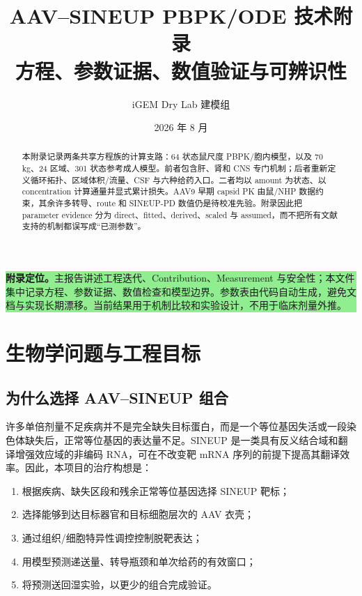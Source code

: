 \documentclass[UTF8,11pt,a4paper]{ctexart}
\title{\vspace{-1.2cm}\textbf{AAV--SINEUP PBPK/ODE 技术附录}\\[0.6em]
\large 方程、参数证据、数值验证与可辨识性}
\author{iGEM Dry Lab 建模组}
\date{2026 年 8 月}
\begin{document}
\maketitle

\begin{center}
\begin{minipage}{0.92\textwidth}
\colorbox{lightgreen}{\parbox{0.96\textwidth}{
\textbf{附录定位。}主报告讲述工程迭代、Contribution、Measurement 与安全性；本文件集中记录方程、参数证据、数值检查和模型边界。参数表由代码自动生成，避免文档与实现长期漂移。当前结果用于机制比较和实验设计，不用于临床剂量外推。
}}
\end{minipage}
\end{center}

\begin{abstract}
本附录记录两条共享方程族的计算支路：64 状态鼠尺度 PBPK/胞内模型，以及 70 kg、24 区域、301 状态参考成人模型。前者包含肝、肾和 CNS 专门机制；后者重新定义循环拓扑、区域体积/流量、CSF 与六种给药入口。二者均以 amount 为状态、以 concentration 计算通量并显式累计损失。AAV9 早期 capsid PK 由鼠/NHP 数据约束，其余许多转导、route 和 SINEUP-PD 数值仍是待校准先验。附录因此把 parameter evidence 分为 direct、fitted、derived、scaled 与 assumed，而不把所有文献支持的机制都误写成“已测参数”。
\end{abstract}

\tableofcontents
\clearpage

\section{生物学问题与工程目标}

\subsection{为什么选择 AAV--SINEUP 组合}
许多单倍剂量不足疾病并不是完全缺失目标蛋白，而是一个等位基因失活或一段染色体缺失后，正常等位基因的表达量不足。SINEUP 是一类具有反义结合域和翻译增强效应域的非编码 RNA，可在不改变靶 mRNA 序列的前提下提高其翻译效率\cite{sineup2015}。因此，本项目的治疗构想是：
\begin{enumerate}
  \item 根据疾病、缺失区段和残余正常等位基因选择 SINEUP 靶标；
  \item 选择能够到达目标器官和目标细胞层次的 AAV 衣壳；
  \item 通过组织/细胞特异性调控控制脱靶表达；
  \item 用模型预测递送量、转导瓶颈和单次给药的有效窗口；
  \item 将预测送回湿实验，以更少的组合完成验证。
\end{enumerate}
\end{document}
